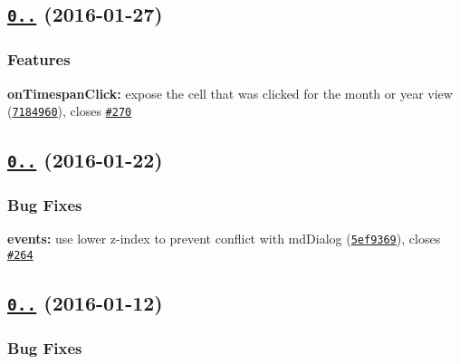 \label{_0.18.4}%
 \subsection*{\href{https://github.com/mattlewis92/angular-bootstrap-calendar/compare/0.18.3...v0.18.4}{\tt 0..} (2016-\/01-\/27)}

\subsubsection*{Features}


\begin{DoxyItemize}
\item {\bfseries on\+Timespan\+Click\+:} expose the cell that was clicked for the month or year view (\href{https://github.com/mattlewis92/angular-bootstrap-calendar/commit/7184960}{\tt 7184960}), closes \href{https://github.com/mattlewis92/angular-bootstrap-calendar/issues/270}{\tt \#270}
\end{DoxyItemize}

\label{_0.18.3}%
 \subsection*{\href{https://github.com/mattlewis92/angular-bootstrap-calendar/compare/0.18.2...v0.18.3}{\tt 0..} (2016-\/01-\/22)}

\subsubsection*{Bug Fixes}


\begin{DoxyItemize}
\item {\bfseries events\+:} use lower z-\/index to prevent conflict with md\+Dialog (\href{https://github.com/mattlewis92/angular-bootstrap-calendar/commit/5ef9369}{\tt 5ef9369}), closes \href{https://github.com/mattlewis92/angular-bootstrap-calendar/issues/264}{\tt \#264}
\end{DoxyItemize}

\label{_0.18.2}%
 \subsection*{\href{https://github.com/mattlewis92/angular-bootstrap-calendar/compare/0.18.1...v0.18.2}{\tt 0..} (2016-\/01-\/12)}

\subsubsection*{Bug Fixes}


